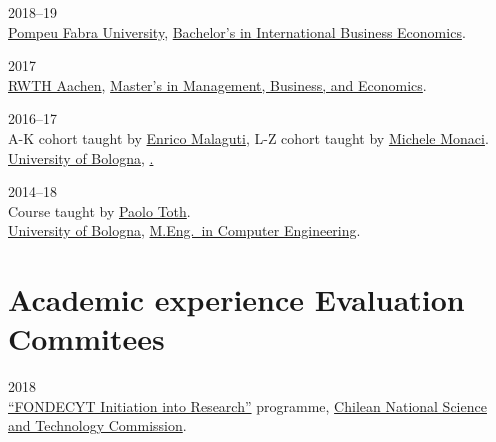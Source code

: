 \begin{paracol}{2}
  \textsc{2018--19}
\switchcolumn
  \\
  \href{https://www.upf.edu/}{Pompeu Fabra University}, \href{https://www.upf.edu/es/web/graus/grau-international-business-economics}{Bachelor's in International Business Economics}.
\end{paracol}

\begin{paracol}{2}
  \textsc{2017}
\switchcolumn
  \\
  \href{http://www.rwth-aachen.de/}{RWTH Aachen}, \href{http://www.wiwi.rwth-aachen.de/cms/Wirtschaftswissenschaften/Studium/Studiengaenge/Masterstudiengaenge/~camq/Wirtschaftswissenschaft-M-Sc-/?lidx=1}{Master's in Management, Business, and Economics}.
\end{paracol}

\begin{paracol}{2}
  \textsc{2016--17}
\switchcolumn
  \\
  A-K cohort taught by \href{https://scholar.google.com/citations?user=3nD4vYkAAAAJ}{Enrico Malaguti}, L-Z cohort taught by \href{https://scholar.google.com/citations?user=wORMYBMAAAAJ}{Michele Monaci}.\\
  \href{https://www.unibo.it}{University of Bologna}, \href{B.Eng.\ in Management Engineering}.
\end{paracol}

\begin{paracol}{2}
  \textsc{2014--18}
\switchcolumn
  \\
  Course taught by \href{https://scholar.google.com/citations?user=2IPL4XIAAAAJ}{Paolo Toth}.\\
  \href{https://www.unibo.it}{University of Bologna}, \href{https://corsi.unibo.it/magistrale/ingegneriainformatica}{M.Eng.\ in Computer Engineering}.
\end{paracol}

\section*{Academic experience {\small Evaluation Commitees}}

\begin{paracol}{2}
  \textsc{2018}
\switchcolumn
  \\
  \href{http://www.conicyt.cl/fondecyt/fondecyt-program/}{``FONDECYT Initiation into Research''} programme, \href{http://www.conicyt.cl/}{Chilean National Science and Technology Commission}.
\end{paracol}

